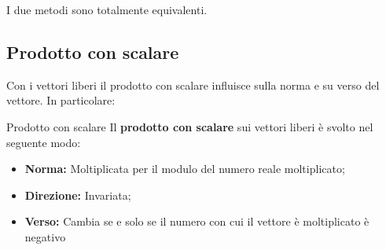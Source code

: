 I due metodi sono totalmente equivalenti.

\subsection{Prodotto con scalare}
Con i vettori liberi il prodotto con scalare influisce sulla norma e su verso del vettore. In particolare:
\begin{teo}{Prodotto con scalare}
    Il \textbf{prodotto con scalare} sui vettori liberi è svolto nel seguente modo:
    \begin{itemize}
        \item \textbf{Norma:} Moltiplicata per il modulo del numero reale moltiplicato;
        \item \textbf{Direzione: } Invariata;
        \item \textbf{Verso: } Cambia se e solo se il numero con cui il vettore è moltiplicato è negativo
    \end{itemize}
\end{teo}
\begin{center}
    \tikzset{external/export = true}
    \tikzset{external/export = false}
\end{center}